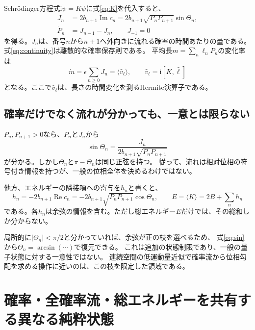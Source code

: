 \documentclass[a4paper,11pt]{ltjsarticle}
\numberwithin{equation}{section}
\newcommand{\ii}{\mathrm i}
\begin{document}
Schr\"odinger方程式$\ii\dot\psi=K\psi$に式\eqref{eq:K}を代入すると、
\begin{align}
 J_n&=2b_{n+1}\operatorname{Im}c_n
 =2b_{n+1}\sqrt{P_nP_{n+1}}\sin\Theta_n,
 \label{eq:J}\\
 \dot P_n&=J_{n-1}-J_n,\qquad J_{-1}=0
 \label{eq:continuity}
\end{align}
を得る。$J_n$は、番号$n$から$n+1$へ外向きに流れる確率の時間あたりの量である。
式\eqref{eq:continuity}は離散的な確率保存則である。
平均長$m=\sum_n\ell_nP_n$の変化率は
\begin{equation}
 \dot m=\epsilon\sum_{n\geq0}J_n
 =\langle\hat v_\ell\rangle,
 \qquad \hat v_\ell=\ii[K,\hat\ell]
 \label{eq:velocity}
\end{equation}
となる。ここで$\hat v_\ell$は、長さの時間変化を測るHermite演算子である。

\subsection{確率だけでなく流れが分かっても、一意とは限らない}
$P_n,P_{n+1}>0$なら、$P_n$と$J_n$から
\begin{equation}
 \sin\Theta_n=\frac{J_n}{2b_{n+1}\sqrt{P_nP_{n+1}}}
 \label{eq:sin}
\end{equation}
が分かる。しかし$\Theta_n$と$\pi-\Theta_n$は同じ正弦を持つ。
従って、流れは相対位相の符号付き情報を持つが、一般の位相全体を決めるわけではない。

他方、エネルギーの隣接項への寄与を$h_n$と書くと、
\begin{equation}
 h_n=-2b_{n+1}\operatorname{Re}c_n
 =-2b_{n+1}\sqrt{P_nP_{n+1}}\cos\Theta_n,
 \qquad E=\langle K\rangle=2B+\sum_n h_n
 \label{eq:energy}
\end{equation}
である。各$h_n$は余弦の情報を含む。ただし総エネルギー$E$だけでは、その総和しか分からない。

局所的に$|\Theta_n|<\pi/2$と分かっていれば、余弦が正の枝を選べるため、
式\eqref{eq:sin}から$\Theta_n=\arcsin(\cdots)$で復元できる。
これは追加の状態制限であり、一般の量子状態に対する一意性ではない。
連続空間の低運動量近似で確率流から位相勾配を求める操作に近いのは、この枝を限定した領域である。

\section{確率・全確率流・総エネルギーを共有する異なる純粋状態}
\end{document}
